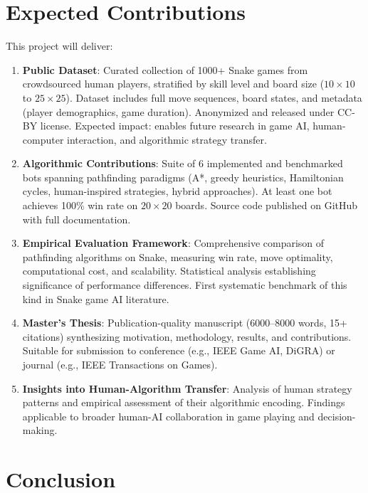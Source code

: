 \documentclass[11pt,a4paper]{article}
\begin{document}
\section{Expected Contributions}

This project will deliver:

\begin{enumerate}
    \item \textbf{Public Dataset}: Curated collection of 1000+ Snake games from crowdsourced human players, stratified by skill level and board size ($10 \times 10$ to $25 \times 25$). Dataset includes full move sequences, board states, and metadata (player demographics, game duration). Anonymized and released under CC-BY license. Expected impact: enables future research in game AI, human-computer interaction, and algorithmic strategy transfer.
    
    \item \textbf{Algorithmic Contributions}: Suite of 6 implemented and benchmarked bots spanning pathfinding paradigms (A*, greedy heuristics, Hamiltonian cycles, human-inspired strategies, hybrid approaches). At least one bot achieves 100\% win rate on $20 \times 20$ boards. Source code published on GitHub with full documentation.
    
    \item \textbf{Empirical Evaluation Framework}: Comprehensive comparison of pathfinding algorithms on Snake, measuring win rate, move optimality, computational cost, and scalability. Statistical analysis establishing significance of performance differences. First systematic benchmark of this kind in Snake game AI literature.
    
    \item \textbf{Master's Thesis}: Publication-quality manuscript (6000--8000 words, 15+ citations) synthesizing motivation, methodology, results, and contributions. Suitable for submission to conference (e.g., IEEE Game AI, DiGRA) or journal (e.g., IEEE Transactions on Games).
    
    \item \textbf{Insights into Human-Algorithm Transfer}: Analysis of human strategy patterns and empirical assessment of their algorithmic encoding. Findings applicable to broader human-AI collaboration in game playing and decision-making.
\end{enumerate}

\section{Conclusion}
\end{document}
